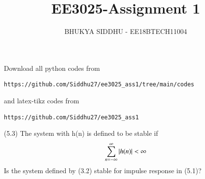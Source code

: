 \documentclass[journal,12pt,twocolumn]{IEEEtran}
\begin{document}
\def\rightbox#1{\makebox[0in][r]{#1}}
\def\centbox#1{\makebox[0in]{#1}}
\def\topbox#1{\raisebox{-\baselineskip}[0in][0in]{#1}}
\def\midbox#1{\raisebox{-0.5\baselineskip}[0in][0in]{#1}}
\vspace{3cm}
\title{EE3025-Assignment 1}
\author{BHUKYA SIDDHU - EE18BTECH11004}
\maketitle
\newpage
\bigskip
\renewcommand{\thefigure}{\theenumi}
\renewcommand{\thetable}{\theenumi}
Download all python codes from 
\begin{lstlisting}
https://github.com/Siddhu27/ee3025_ass1/tree/main/codes
\end{lstlisting}
%
and latex-tikz codes from 
%
\begin{lstlisting}
https://github.com/Siddhu27/ee3025_ass1
\end{lstlisting}
(5.3) The system with h(n) is defined to be stable if 
\begin{align}
\sum_{n=-\infty}^{\infty} \left\vert h(n)\right\vert < \infty
\end{align} 
Is the system defined by (3.2) stable for impulse response in (5.1)?
\end{document}
